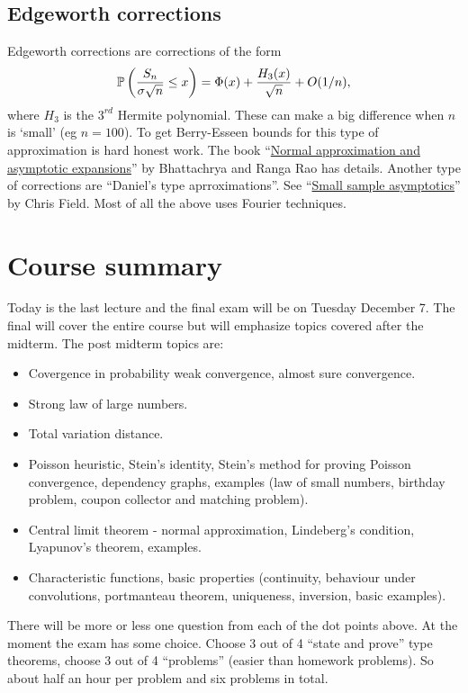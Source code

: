 \subsection{Edgeworth corrections}
Edgeworth corrections are corrections of the form 
\[{\mathbb{P}}\left(\frac{S_n}{\sigma\sqrt{n}}\le x\right) = \Phi(x)+\frac{H_3(x)}{\sqrt{n}}+O(1/n), \]
where $H_3$ is the $3^{rd}$ Hermite polynomial. These can make a big difference when $n$ is `small' (eg $n=100$). To get Berry-Esseen bounds for this type of approximation is hard honest work. The book ``\href{https://www.cambridge.org/us/academic/subjects/statistics-probability/probability-theory-and-stochastic-processes/normal-approximation-and-asymptotic-expansions?format=PB&isbn=9780898718973}{Normal approximation and asymptotic expansions}'' by Bhattachrya and Ranga Rao has details. Another type of corrections are ``Daniel's type aprroximations''. See ``\href{https://projecteuclid.org/ebooks/institute-of-mathematical-statistics-lecture-notes-monograph-series/Small-sample-asymptotics/toc/10.1214/lnms/1215468235}{Small sample asymptotics}'' by Chris Field. Most of all the above uses Fourier techniques.
\section{Course summary}
Today is the last lecture and the final exam will be on Tuesday December 7. The final will cover the entire course but will emphasize topics covered after the midterm. The post midterm topics are:
\begin{itemize}
    \item Covergence in probability weak convergence, almost sure convergence.
    \item Strong law of large numbers.
    \item Total variation distance.
    \item Poisson heuristic, Stein's identity, Stein's method for proving Poisson convergence, dependency graphs, examples (law of small numbers, birthday problem, coupon collector and matching problem).
    \item Central limit theorem - normal approximation, Lindeberg's condition, Lyapunov's theorem, examples.
    \item Characteristic functions, basic properties (continuity, behaviour under convolutions, portmanteau theorem, uniqueness, inversion, basic examples).
\end{itemize}
There will be more or less one question from each of the dot points above. At the moment the exam has some choice. Choose 3 out of 4 ``state and prove'' type theorems, choose 3 out of 4 ``problems'' (easier than homework problems). So about half an hour per problem and six problems in total.

